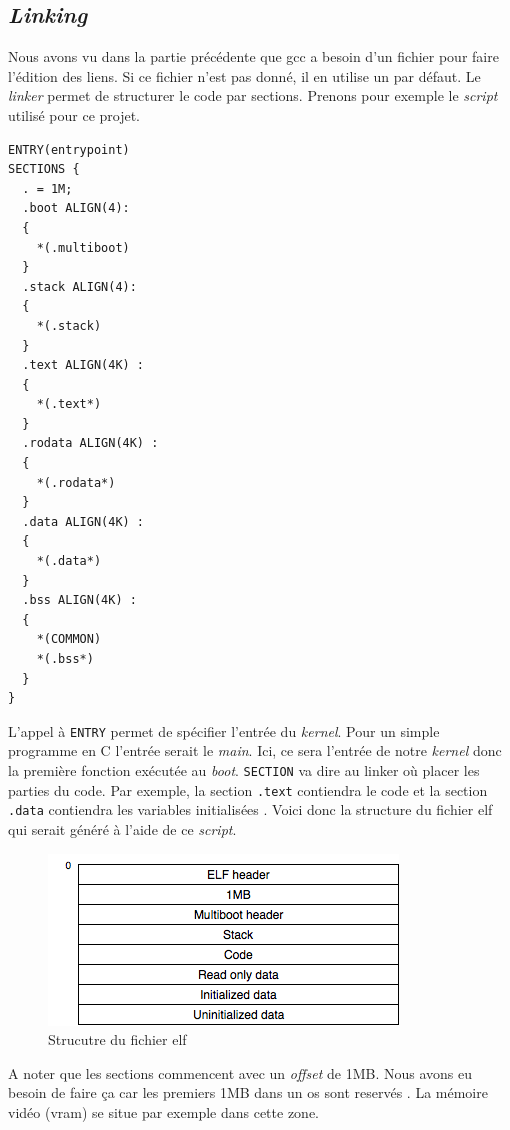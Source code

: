 \documentclass[a4paper, 12pt]{article}
\begin{document}

\subsection{\textit{Linking}}
Nous avons vu dans la partie précédente que \acrshort{gcc} a besoin d'un fichier
pour faire l'édition des liens. Si ce fichier n'est pas donné, il en utilise un par
défaut. Le \textit{linker} permet de structurer le code par sections. Prenons
pour exemple le \textit{script} utilisé pour ce projet.

\begin{verbatim}
ENTRY(entrypoint)
SECTIONS {
  . = 1M;
  .boot ALIGN(4):
  {
    *(.multiboot)
  }
  .stack ALIGN(4):
  {
    *(.stack)
  }
  .text ALIGN(4K) :
  {
    *(.text*)
  }
  .rodata ALIGN(4K) :
  {
    *(.rodata*)
  }
  .data ALIGN(4K) :
  {
    *(.data*)
  }
  .bss ALIGN(4K) :
  {
    *(COMMON)
    *(.bss*)
  }
}
\end{verbatim}

L'appel à \texttt{ENTRY} permet de spécifier l'entrée du \textit{kernel}.
Pour un simple programme en C l'entrée serait le \textit{main}. Ici, ce sera
l'entrée de notre \textit{kernel} donc la première fonction exécutée au \textit{boot}.
\texttt{SECTION} va dire au linker où placer les parties du code. Par exemple, 
la section \texttt{.text} contiendra le code et la section \texttt{.data}
contiendra les variables initialisées \cite{ref42,ref9,ref10,ref11}. Voici donc la structure
du fichier \acrshort{elf} qui serait généré à l'aide de ce \textit{script}.

\begin{figure}[!h]
  \centering
  \includegraphics[scale=0.75]{images/elf_struct.png}
  \caption{Strucutre du fichier \acrshort{elf}}
\end{figure}

A noter que les sections commencent avec un \textit{offset} de 1MB. Nous avons eu
besoin de faire ça car les premiers 1MB dans un \acrshort{os} sont reservés \cite{ref42,ref13}.
La mémoire vidéo (\acrshort{vram}) se situe par exemple dans cette zone.
\end{document}
